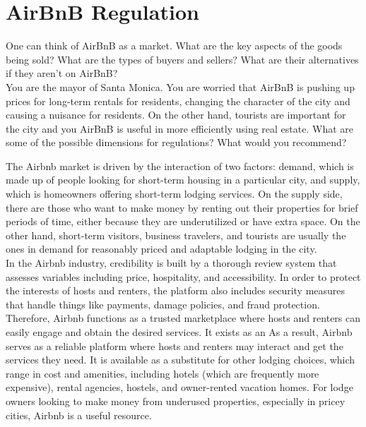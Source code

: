 \section{AirBnB Regulation}

\begin{tcolorbox}
    One can think of AirBnB as a market. What are the key aspects of the goods being sold? What
    are the types of buyers and sellers? What are their alternatives if they aren’t on AirBnB?\\

    You are the mayor of Santa Monica. You are worried that AirBnB is pushing up prices for long-term
    rentals for residents, changing the character of the city and causing a nuisance for residents. On the
    other hand, tourists are important for the city and you AirBnB is useful in more efficiently using real
    estate. What are some of the possible dimensions for regulations? What would you recommend?
\end{tcolorbox}

The Airbnb market is driven by the interaction of two factors: demand, which is made up of people looking for short-term housing in a particular city, and supply, which is homeowners offering short-term lodging services. On the supply side, there are those who want to make money by renting out their properties for brief periods of time, either because they are underutilized or have extra space. On the other hand, short-term visitors, business travelers, and tourists are usually the ones in demand for reasonably priced and adaptable lodging in the city.\\

In the Airbnb industry, credibility is built by a thorough review system that assesses variables including price, hospitality, and accessibility. In order to protect the interests of hosts and renters, the platform also includes security measures that handle things like payments, damage policies, and fraud protection.\\

Therefore, Airbnb functions as a trusted marketplace where hosts and renters can easily engage and obtain the desired services. It exists as an As a result, Airbnb serves as a reliable platform where hosts and renters may interact and get the services they need. It is available as a substitute for other lodging choices, which range in cost and amenities, including hotels (which are frequently more expensive), rental agencies, hostels, and owner-rented vacation homes. For lodge owners looking to make money from underused properties, especially in pricey cities, Airbnb is a useful resource.\\

